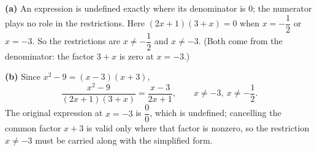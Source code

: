 \textbf{(a)} An expression is undefined exactly where its denominator is $0$; the numerator plays no role in the restrictions. Here $(2x+1)(3+x)=0$ when $x=-\dfrac{1}{2}$ or $x=-3$. So the restrictions are $x\ne-\dfrac{1}{2}$ and $x\ne-3$. (Both come from the denominator: the factor $3+x$ is zero at $x=-3$.)

\textbf{(b)} Since $x^2-9=(x-3)(x+3)$,
\[\dfrac{x^2-9}{(2x+1)(3+x)}=\dfrac{x-3}{2x+1},\qquad x\ne-3,\ x\ne-\dfrac{1}{2}.\]
The original expression at $x=-3$ is $\dfrac{0}{0}$, which is undefined; cancelling the common factor $x+3$ is valid only where that factor is nonzero, so the restriction $x\ne-3$ must be carried along with the simplified form.
